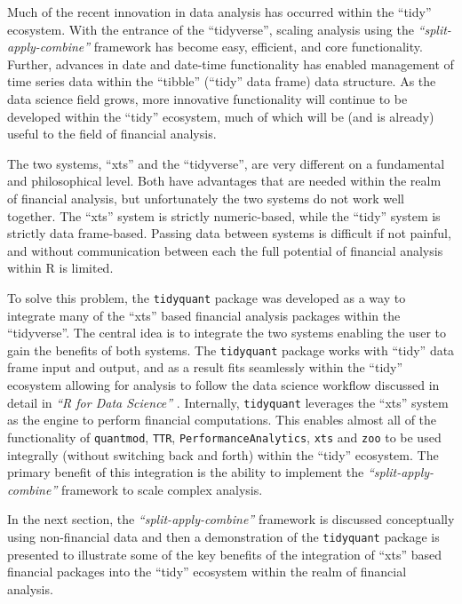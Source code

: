 Much of the recent innovation in data analysis has occurred within the
``tidy'' ecosystem. With the entrance of the ``tidyverse'', scaling
analysis using the \emph{``split-apply-combine''} framework has become
easy, efficient, and core functionality. Further, advances in date and
date-time functionality has enabled management of time series data
within the ``tibble'' (``tidy'' data frame) data structure. As the data
science field grows, more innovative functionality will continue to be
developed within the ``tidy'' ecosystem, much of which will be (and is
already) useful to the field of financial analysis.

The two systems, ``xts'' and the ``tidyverse'', are very different on a
fundamental and philosophical level. Both have advantages that are
needed within the realm of financial analysis, but unfortunately the two
systems do not work well together. The ``xts'' system is strictly
numeric-based, while the ``tidy'' system is strictly data frame-based.
Passing data between systems is difficult if not painful, and without
communication between each the full potential of financial analysis
within R is limited.

To solve this problem, the \texttt{tidyquant} package was developed as a
way to integrate many of the ``xts'' based financial analysis packages
within the ``tidyverse''. The central idea is to integrate the two
systems enabling the user to gain the benefits of both systems. The
\texttt{tidyquant} package works with ``tidy'' data frame input and
output, and as a result fits seamlessly within the ``tidy'' ecosystem
allowing for analysis to follow the data science workflow discussed in
detail in \emph{``R for Data Science''} \citep{R4DS2017}. Internally,
\texttt{tidyquant} leverages the ``xts'' system as the engine to perform
financial computations. This enables almost all of the functionality of
\texttt{quantmod}, \texttt{TTR}, \texttt{PerformanceAnalytics},
\texttt{xts} and \texttt{zoo} to be used integrally (without switching
back and forth) within the ``tidy'' ecosystem. The primary benefit of
this integration is the ability to implement the
\emph{``split-apply-combine''} framework to scale complex analysis.

In the next section, the \emph{``split-apply-combine''} framework is
discussed conceptually using non-financial data and then a demonstration
of the \texttt{tidyquant} package is presented to illustrate some of the
key benefits of the integration of ``xts'' based financial packages into
the ``tidy'' ecosystem within the realm of financial analysis.

